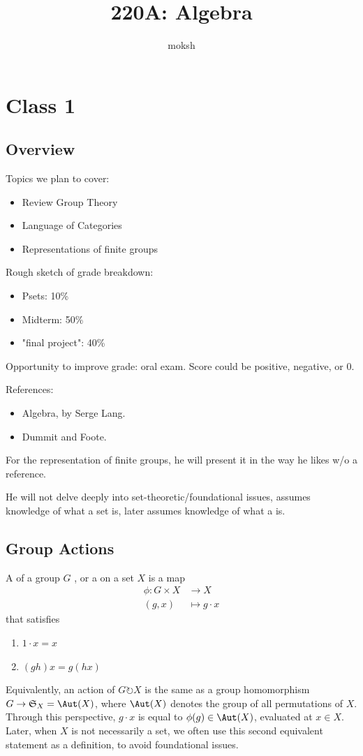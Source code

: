 \documentclass[12pt]{scrartcl}
\title{220A: Algebra}
\author{moksh}
\begin{document}
\maketitle
\tableofcontents

\newpage

\section{Class 1}


\subsection{Overview}

Topics we plan to cover:
\begin{itemize}
	\item Review Group Theory
	\item Language of Categories
	\item Representations of finite groups
\end{itemize}

Rough sketch of grade breakdown:
\begin{itemize}
	\item Psets: 10\%
	\item Midterm: 50\%
	\item "final project": 40\%
\end{itemize}

Opportunity to improve grade: oral exam. 
Score could be positive, negative, or 0.

References: 
\begin{itemize}
	\item Algebra, by Serge Lang. 
	\item Dummit and Foote.
\end{itemize}
For the representation of finite groups, he will present it in the way he likes w/o a reference.

He will not delve deeply into set-theoretic/foundational issues, assumes knowledge of what a set is, later assumes knowledge of what a  is.

\subsection{Group Actions}
A  of a group $G$ , or a  on a set $X$ is a map 
\begin{align*}
	\phi: G \times  X &\to X \\
	(g, x) &\mapsto g \cdot x
\end{align*}
that satisfies 
\begin{enumerate}
	\item $1 \cdot x = x$
	\item $(gh)x = g(hx)$
\end{enumerate}
Equivalently, an action of $G \circlearrowright X$ is the same as a group homomorphism $G \to \mathfrak{S}_X = \Aut(X)$, where $\Aut(X)$ denotes the group of all permutations of $X$.
Through this perspective, $g \cdot x$ is equal to $\phi(g) \in \Aut(X)$, evaluated at $x \in X$. 
Later, when $X$ is not necessarily a set, we often use this second equivalent statement as a definition, to avoid foundational issues.
\end{document}
